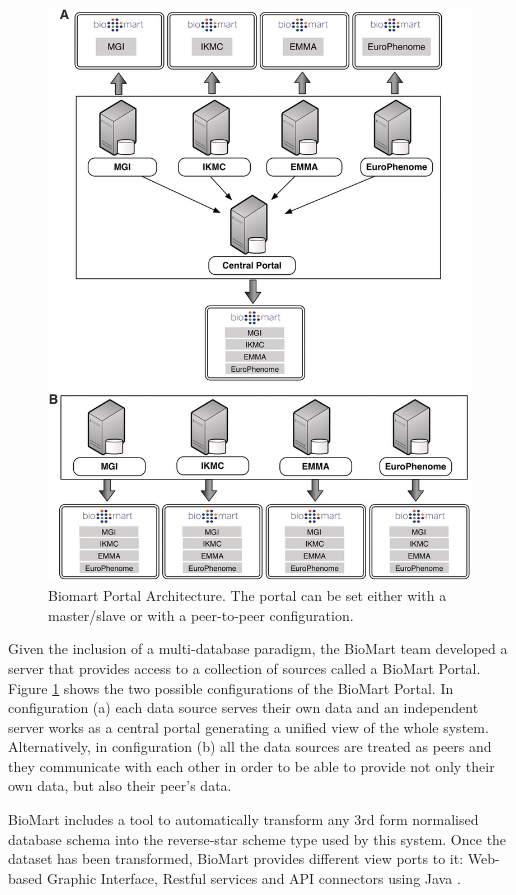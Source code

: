\begin{figure}  
\centering
\includegraphics[width=5in]{figures/biomart.png}
\caption[Biomart Portal Architecture.]{Biomart Portal Architecture. The portal can be set either with a master/slave or with a peer-to-peer configuration.
\label{fig:biomart}}
\end{figure}

Given the inclusion of a multi-database paradigm, the BioMart team developed a server that provides access to a collection of sources called a BioMart Portal. Figure \ref{fig:biomart} shows the two possible configurations of the BioMart Portal. In configuration (a) each data source serves their own data and an independent server works as a central portal generating a unified view of the whole system. Alternatively, in configuration (b) all the data sources are treated as peers and they communicate with each other in order to be able to provide not only their own data, but also their peer's data.

BioMart includes a tool to automatically transform any 3rd form normalised database schema into the reverse-star scheme type used by this system. Once the dataset has been transformed, BioMart provides different view ports to it: Web-based Graphic Interface, Restful services and API connectors using Java \cite{KAS2011}.



